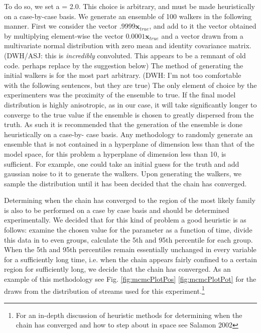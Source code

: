 \documentclass[12pt,preprint]{aastex}
\newcommand{\mtensor}[1]{\boldsymbol{#1}}
\newcommand{\mvector}[1]{\mtensor{#1}}
\newcommand{\vx}{\mvector{x}}
\begin{document}
To do so, we set a = 2.0. This choice is arbitrary, and must be made heuristically
on a case-by-case basis. We generate an ensemble of 100 
walkers in the following manner. First we consider the vector
$.9999\vx_{true}$, and add to it the vector obtained by multiplying
element-wise the vector $0.0001\vx_{true}$ and a vector drawn from a
multivariate normal distribution with zero mean and identity
covariance matrix. (DWH/ASJ: this is \emph{incredibly} convoluted. This appears to be
a remnant of old code. perhaps replace by the suggestion below) The method of
generating the initial walkers is for the most part arbitrary. 
(DWH: I'm not too comfortable with the following sentences, but they are true) 
The only element of choice by the experimenters was the proximity of the
ensemble to true. If the final model distribution is highly
anisotropic, as in our case, it will take significantly longer to
converge to the true value if the ensemble is chosen to greatly
dispersed from the truth. As such it is recommended that the
generation of the ensemble is done heuristically on a case-by- case
basis. Any methodology to randomly generate an ensemble that is not contained in a
hyperplane of dimension less than that of the model space, for
this problem a hyperplane of dimension less than 10, is sufficient.
For example, one could take an initial guess for the truth and add
gaussian noise to it to generate the walkers. Upon generating the
walkers, we sample the distribution until it has been decided that the
chain has converged.

Determining when the chain has converged to the region of the most
likely family is also to be performed on a case by case basis and
should be determined experimentally. We decided that for this kind of
problem a good heuristic is as follows: examine the chosen value for
the parameter as a function of time, divide this data in to even
groups, calculate the 5th and 95th percentile for each group. When the
5th and 95th percentiles remain essentially unchanged in every
variable for a sufficiently long time, i.e. when the chain appears
fairly confined to a certain region for sufficiently long, we decide
that the chain has converged. As an example of this methodology see Fig.
\ref{fig:mcmcPlotPos} \ref{fig:mcmcPlotPot} for the draws from the distribution
of streams used for this experiment.\footnote{For an in-depth
discussion of heuristic methods for determining when the chain has converged
and how to step about in space see Salamon 2002}
\end{document}

